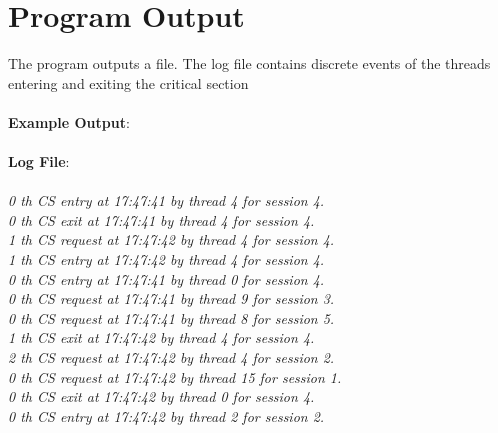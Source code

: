 \documentclass[a4paper,12pt]{report}
\begin{document}
\section{Program Output}
The program outputs a file. The log file contains discrete events of the threads entering and exiting the critical section\\\\
\textbf{Example Output}:\\\\
\textbf{Log File}:\\\\
\textit{0 th CS entry at 17:47:41 by thread 4 for session 4.\\
0 th CS exit at 17:47:41 by thread 4 for session 4.\\
1 th CS request at 17:47:42 by thread 4 for session 4.\\
1 th CS entry at 17:47:42 by thread 4 for session 4.\\
0 th CS entry at 17:47:41 by thread 0 for session 4.\\
0 th CS request at 17:47:41 by thread 9 for session 3.\\
0 th CS request at 17:47:41 by thread 8 for session 5.\\
1 th CS exit at 17:47:42 by thread 4 for session 4.\\
2 th CS request at 17:47:42 by thread 4 for session 2.\\
0 th CS request at 17:47:42 by thread 15 for session 1.\\
0 th CS exit at 17:47:42 by thread 0 for session 4.\\
0 th CS entry at 17:47:42 by thread 2 for session 2.\\\\}

\newpage
\end{document}
